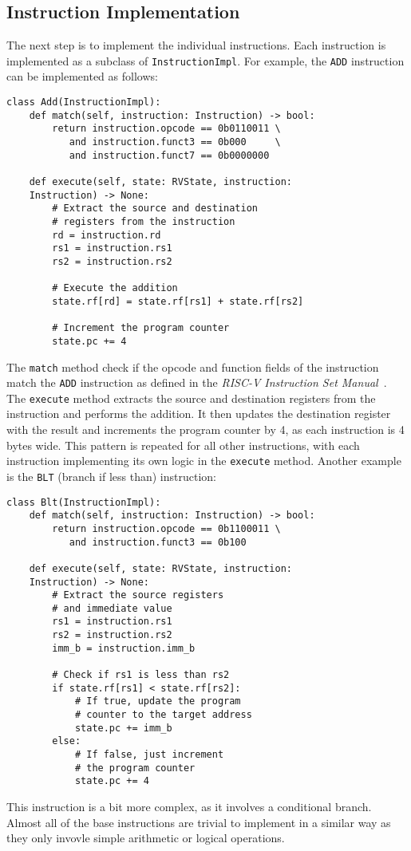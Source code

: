 \documentclass[sigconf]{acmart}
\begin{document}
\subsection{Instruction Implementation}\label{sec:instruction-implementation}
The next step is to implement the individual instructions. Each instruction is implemented as a subclass of \texttt{InstructionImpl}.
For example, the \texttt{ADD} instruction can be implemented as follows:
\begin{verbatim}
class Add(InstructionImpl):
    def match(self, instruction: Instruction) -> bool:
        return instruction.opcode == 0b0110011 \
           and instruction.funct3 == 0b000     \
           and instruction.funct7 == 0b0000000
    
    def execute(self, state: RVState, instruction: 
    Instruction) -> None:
        # Extract the source and destination 
        # registers from the instruction
        rd = instruction.rd
        rs1 = instruction.rs1
        rs2 = instruction.rs2

        # Execute the addition
        state.rf[rd] = state.rf[rs1] + state.rf[rs2]

        # Increment the program counter
        state.pc += 4
\end{verbatim}
The \texttt{match} method check if the opcode and function fields of the instruction match the \texttt{ADD} instruction as defined in the \textit{RISC-V Instruction Set Manual}~\cite{riscv-spec}.
The \texttt{execute} method extracts the source and destination registers from the instruction and performs the addition. It then updates the destination register with the result and increments the program counter by 4, as each instruction is 4 bytes wide.
This pattern is repeated for all other instructions, with each instruction implementing its own logic in the \texttt{execute} method.
Another example is the \texttt{BLT} (branch if less than) instruction:
\begin{verbatim}
class Blt(InstructionImpl):
    def match(self, instruction: Instruction) -> bool:
        return instruction.opcode == 0b1100011 \
           and instruction.funct3 == 0b100
    
    def execute(self, state: RVState, instruction: 
    Instruction) -> None:
        # Extract the source registers
        # and immediate value
        rs1 = instruction.rs1
        rs2 = instruction.rs2
        imm_b = instruction.imm_b

        # Check if rs1 is less than rs2
        if state.rf[rs1] < state.rf[rs2]:
            # If true, update the program 
            # counter to the target address
            state.pc += imm_b
        else:
            # If false, just increment 
            # the program counter
            state.pc += 4
\end{verbatim}
This instruction is a bit more complex, as it involves a conditional branch. 
Almost all of the base instructions are trivial to implement in a similar way as they only invovle simple arithmetic or logical operations.
\end{document}
